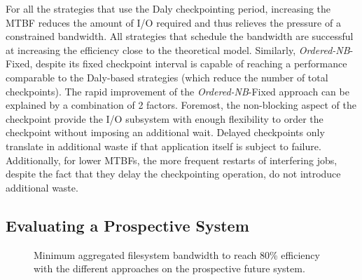 \documentclass[two]{article}
\newcommand{\fifononblock}{\emph{Ordered-NB}\xspace}
\def\fifofixed{\fifononblock-Fixed\xspace}
\begin{document}
For all the strategies that use the Daly checkpointing period, increasing the
MTBF reduces the amount of I/O required and thus relieves the pressure of a
constrained bandwidth. All strategies that schedule the bandwidth are
successful at increasing the efficiency close to the theoretical model.
%
Similarly, \fifofixed, despite its fixed checkpoint interval is capable of
reaching a performance comparable to the Daly-based strategies (which reduce the
number of total checkpoints). The rapid improvement of the \fifofixed approach can be
explained by a combination of 2 factors. Foremost, the non-blocking aspect of
the checkpoint provide the I/O subsystem with enough flexibility to order the
checkpoint without imposing an additional wait. Delayed checkpoints only translate
in additional waste if that application itself is subject to failure.
Additionally, for lower MTBFs, the more frequent restarts of interfering jobs,
despite the fact that they delay the checkpointing operation, do not introduce
additional waste.


\subsection{Evaluating a Prospective System}

\begin{figure}
  \begin{center}
    \resizebox{1.05\linewidth}{!}{}
  \end{center}
  \caption{Minimum aggregated filesystem bandwidth to reach 80\%
    efficiency with the different approaches on the prospective
    future system.\label{fig:prosp}}
\end{figure}
\end{document}
